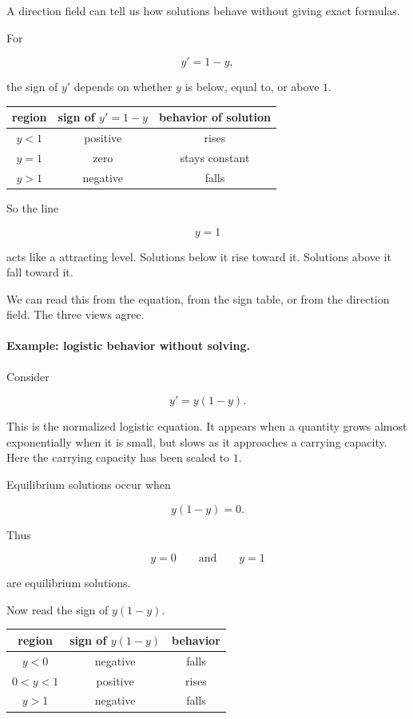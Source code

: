 A direction field can tell us how solutions behave without giving exact formulas.

For

\[
y'=1-y,
\]

the sign of \(y'\) depends on whether \(y\) is below, equal to, or above \(1\).

\begin{center}
\begin{tabular}{c|c|c}
\textbf{region} & \textbf{sign of \(y'=1-y\)} & \textbf{behavior of solution} \\ \hline
\(y<1\) & positive & rises \\
\(y=1\) & zero & stays constant \\
\(y>1\) & negative & falls
\end{tabular}
\end{center}

So the line

\[
y=1
\]

acts like a attracting level.  Solutions below it rise toward it.  Solutions above it fall
toward it.

We can read this from the equation, from the sign table, or from the direction field.
The three views agree.

\paragraph{Example: logistic behavior without solving.}
Consider

\[
y'=y(1-y).
\]

This is the normalized logistic equation.  It appears when a quantity grows almost
exponentially when it is small, but slows as it approaches a carrying capacity.  Here the
carrying capacity has been scaled to \(1\).

Equilibrium solutions occur when

\[
y(1-y)=0.
\]

Thus

\[
y=0
\qquad\text{and}\qquad
y=1
\]

are equilibrium solutions.

Now read the sign of \(y(1-y)\).

\begin{center}
\begin{tabular}{c|c|c}
\textbf{region} & \textbf{sign of \(y(1-y)\)} & \textbf{behavior} \\ \hline
\(y<0\) & negative & falls \\
\(0<y<1\) & positive & rises \\
\(y>1\) & negative & falls
\end{tabular}
\end{center}

